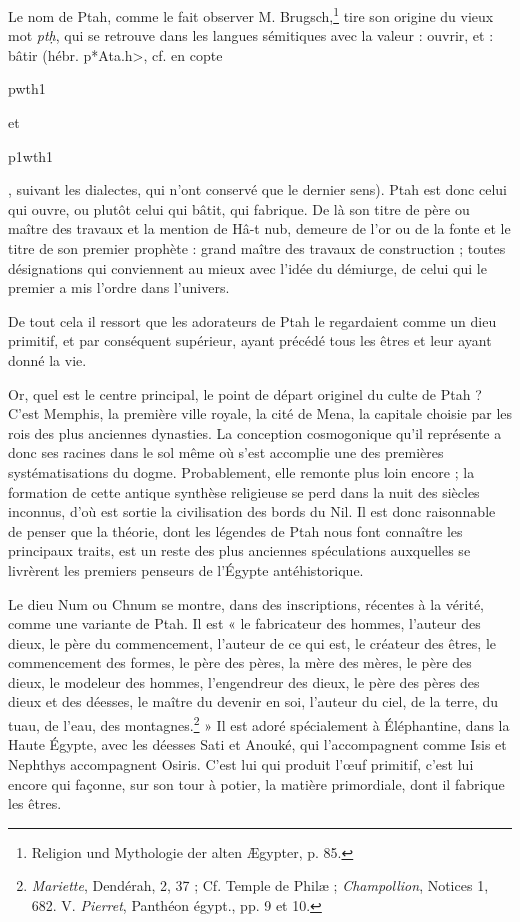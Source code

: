 \documentclass[a4paper, 11pt, oneside]{article}
\begin{document}
Le nom de Ptah, comme le fait observer M. Brugsch,\footnote{Religion und Mythologie der alten Ægypter, p. 85.} tire son origine du vieux mot \emph{ptḥ}, qui se retrouve dans les langues sémitiques avec la valeur : ouvrir, et : bâtir (hébr. \foreignlanguage{hebrew}{\<p*Ata.h>}, cf. en copte \begin{coptic}pwth1\end{coptic} et \begin{coptic}p1wth1\end{coptic}, suivant les dialectes, qui n'ont conservé que le dernier sens). Ptah est donc celui qui ouvre, ou plutôt celui qui bâtit, qui fabrique. De là son titre de père ou maître des travaux et la mention de Hâ-t nub, demeure de l'or ou de la fonte et le titre de son premier prophète : grand maître des travaux de construction ; toutes désignations qui conviennent au mieux avec l'idée du démiurge, de celui qui le premier a mis l'ordre dans l'univers.

De tout cela il ressort que les adorateurs de Ptah le regardaient comme un dieu primitif, et par conséquent supérieur, ayant précédé tous les êtres et leur ayant donné la vie.

Or, quel est le centre principal, le point de départ originel du culte de Ptah ? C'est Memphis, la première ville royale, la cité de Mena, la capitale choisie par les rois des plus anciennes dynasties. La conception cosmogonique qu'il représente a donc ses racines dans le sol même où s'est accomplie une des premières systématisations du dogme. Probablement, elle remonte plus loin encore ; la formation de cette antique synthèse religieuse se perd dans la nuit des siècles inconnus, d'où est sortie la civilisation des bords du Nil. Il est donc raisonnable de penser que la théorie, dont les légendes de Ptah nous font connaître les principaux traits, est un reste des plus anciennes spéculations auxquelles se livrèrent les premiers penseurs de l'Égypte antéhistorique.

Le dieu Num ou Chnum se montre, dans des inscriptions, récentes à la vérité, comme une variante de Ptah. Il est « le fabricateur des hommes, l'auteur des dieux, le père du commencement, l'auteur de ce qui est, le créateur des êtres, le commencement des formes, le père des pères, la mère des mères, le père des dieux, le modeleur des hommes, l'engendreur des dieux, le père des pères des dieux et des déesses, le maître du devenir en soi, l'auteur du ciel, de la terre, du tuau, de l'eau, des montagnes.\footnote{\emph{Mariette}, Dendérah, 2, 37 ; Cf. Temple de Philæ ; \emph{Champollion}, Notices 1, 682. V. \emph{Pierret}, Panthéon égypt., pp. 9 et 10.} » Il est adoré spécialement à Éléphantine, dans la Haute Égypte, avec les déesses Sati et Anouké, qui l'accompagnent comme Isis et Nephthys accompagnent Osiris. C'est lui qui produit l'œuf primitif, c'est lui encore qui façonne, sur son tour à potier, la matière primordiale, dont il fabrique les êtres.
\end{document}
